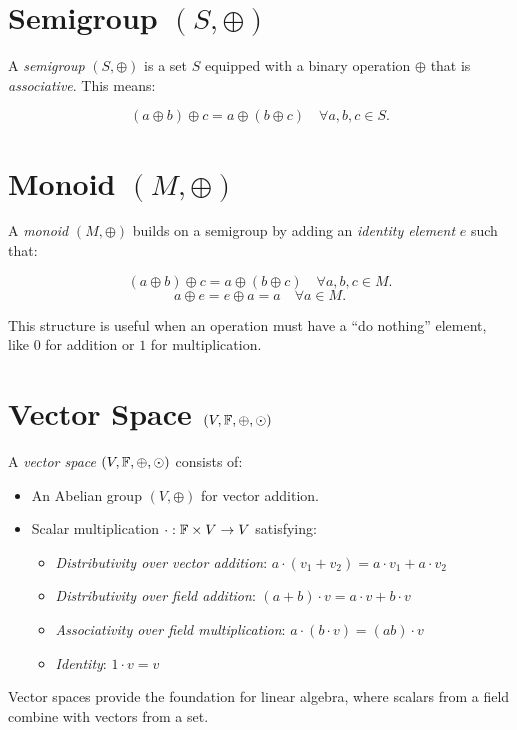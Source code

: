 \section{Semigroup \texorpdfstring{\((S, \oplus)\)}{}}

A \emph{semigroup} \((S, \oplus)\) is a set \(S\) equipped with a binary operation \(\oplus\) that is \emph{associative}. This means:

\[
	(a \oplus b) \oplus c = a \oplus (b \oplus c) \quad \forall a, b, c \in S.
\]

\section{Monoid \texorpdfstring{\((M, \oplus)\)}{}}

A \emph{monoid} \((M, \oplus)\) builds on a semigroup by adding an \emph{identity element} \(e\) such that:

\[
	(a \oplus b) \oplus c = a \oplus (b \oplus c) \quad \forall a, b, c \in M.
\]
\[
	a \oplus e = e \oplus a = a \quad \forall a \in M.
\]

This structure is useful when an operation must have a ``do nothing'' element, like \(0\) for addition or \(1\) for multiplication.

\section{Vector Space \texorpdfstring{\((V, \mathbb{F}, \oplus, \odot)\)}{}}

A \emph{vector space} \((V, \mathbb{F}, \oplus, \odot)\) consists of:

\begin{itemize}

	\item An Abelian group \((V, \oplus)\) for vector addition.

	\item Scalar multiplication \(\cdot: \mathbb{F} \times V \to V\) satisfying:

	      \begin{itemize}

		      \item \emph{Distributivity over vector addition}: \(a \cdot (v_1 + v_2) = a \cdot v_1 + a \cdot v_2\)

		      \item \emph{Distributivity over field addition}: \((a + b) \cdot v = a \cdot v + b \cdot v\)

		      \item \emph{Associativity over field multiplication}: \(a \cdot (b \cdot v) = (ab) \cdot v\)

		      \item \emph{Identity}: \(1 \cdot v = v\)

	      \end{itemize}

\end{itemize}

Vector spaces provide the foundation for linear algebra, where scalars from a field combine with vectors from a set.

